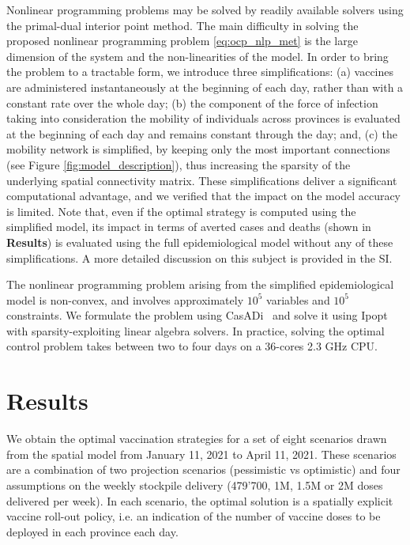 Nonlinear programming problems may be solved by readily available solvers using the primal-dual interior point method. The main difficulty in solving the proposed nonlinear programming problem \eqref{eq:ocp_nlp_met} is the large dimension of the system and the non-linearities of the model. In order to bring the problem to a tractable form, we introduce three simplifications: (a) vaccines are administered instantaneously at the beginning of each day, rather than with a constant rate over the whole day; (b) the component of the force of infection taking into consideration the mobility of individuals across provinces is evaluated at the beginning of each day and remains constant through the day; and, (c) the mobility network is simplified, by keeping only the most important connections (see Figure \ref{fig:model_description}), thus increasing the sparsity of the underlying spatial connectivity matrix. These simplifications deliver a significant computational advantage, and we verified that the impact on the model accuracy is limited. Note that, even if the optimal strategy is computed using the simplified model, its impact in terms of averted cases and deaths (shown in \textbf{Results}) is evaluated using the full epidemiological model without any of these simplifications. A more detailed discussion on this subject is provided in the SI.

The nonlinear programming problem arising from the simplified epidemiological model is non-convex, and involves approximately $10^{5}$ variables and $10^5$ constraints. We formulate the problem using CasADi~\cite{Andersson:CasADiSoftwareFramework:2018} and solve it using Ipopt~\cite{Wachter:ImplementationInteriorpointFilter:2006} with sparsity-exploiting linear algebra solvers. 
In practice, solving the optimal control problem takes between two to four days on a 36-cores 2.3 GHz CPU. %

\section{Results}
We obtain the optimal vaccination strategies for a set of eight scenarios drawn from the spatial model from January 11, 2021 to April 11, 2021. These scenarios are a combination of two projection scenarios (pessimistic vs optimistic) and four assumptions on the weekly stockpile delivery (479'700, 1M, 1.5M or 2M doses delivered per week). In each scenario, the optimal solution is a spatially explicit vaccine roll-out policy, i.e. an indication of the number of vaccine doses to be deployed in each province each day. %
